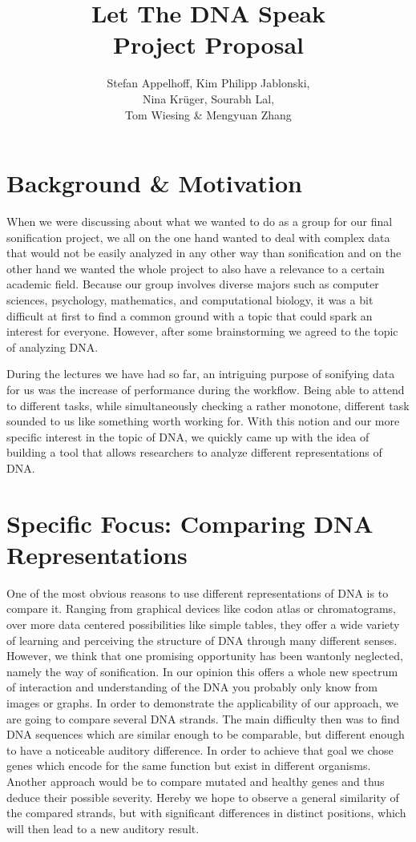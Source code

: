 \documentclass[10pt]{article}
\title{Let The DNA Speak\\Project Proposal}
\author{Stefan Appelhoff, Kim Philipp Jablonski, \\Nina Krüger, Sourabh Lal, \\Tom Wiesing \& Mengyuan Zhang}
\begin{document}
\clearpage
\maketitle
\thispagestyle{empty}
\newpage

\clearpage
\thispagestyle{empty}
\tableofcontents
\newpage

\setcounter{page}{1}
\section{Background \& Motivation}

When we were discussing about what we wanted to do as a group for our final sonification project, we all on the one hand wanted to deal with complex data that would not be easily analyzed in any other way than sonification and on the other hand we wanted the whole project to also have a relevance to a certain academic field. Because our group involves diverse majors such as computer sciences, psychology, mathematics, and computational biology, it was a bit difficult at first to find a common ground with a topic that could spark an interest for everyone. However, after some brainstorming we agreed to the topic of analyzing DNA.

During the lectures we have had so far, an intriguing purpose of sonifying data for us was the increase of performance during the workflow. Being able to attend to different tasks, while simultaneously checking a rather monotone, different task sounded to us like something worth working for. With this notion and our more specific interest in the topic of DNA, we quickly came up with the idea of building a tool that allows researchers to analyze different representations of DNA.

\section{Specific Focus: Comparing DNA Representations}

One of the most obvious reasons to use different representations of DNA is to compare it. Ranging from graphical devices like codon atlas or chromatograms, over more data centered possibilities like simple tables, they offer a wide variety of learning and perceiving the structure of DNA through many different senses.
However, we think that one promising opportunity has been wantonly neglected, namely the way of sonification. In our opinion this offers a whole new spectrum of interaction and understanding of the DNA you probably only know from images or graphs.
In order to demonstrate the applicability of our approach, we are going to compare several DNA strands. The main difficulty then was to find DNA sequences which are similar enough to be comparable, but different enough to have a noticeable auditory difference.
In order to achieve that goal we chose genes which encode for the same function but exist in different organisms. Another approach would be to compare mutated and healthy genes and thus deduce their possible severity. Hereby we hope to observe a general similarity of the compared strands, but with significant differences in distinct positions, which will then lead to a new auditory result.
\end{document}
